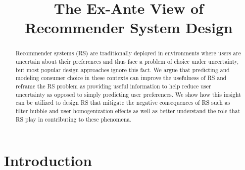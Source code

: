 \documentclass[sigconf]{acmart}
\begin{document}
%
\title{The Ex-Ante View of Recommender System Design}
%

%
\begin{abstract}
Recommender systems (RS) are traditionally deployed in environments where users are uncertain about their preferences and thus face a problem of choice under uncertainty, but most popular design approaches ignore this fact. We argue that predicting and modeling consumer choice in these contexts can improve the usefulness of RS and reframe the RS problem as providing useful information to help reduce user uncertainty as opposed to simply predicting user preferences. We show how this insight can be utilized to design RS that mitigate the negative consequences of RS such as filter bubble and user homogenization effects as well as better understand the role that RS play in contributing to these phenomena.
\end{abstract}

%
%

%

%
\maketitle

\section{Introduction}
\end{document}

